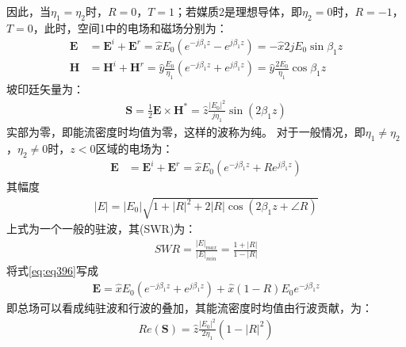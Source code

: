 \documentclass{article}
\numberwithin{equation}{section}
\begin{document}
因此，当$\eta_1=\eta_2$时，$R=0$，$T=1$；若媒质2是理想导体，即$\eta_2=0$时，$R=-1$，$T=0$，此时，空间1中的电场和磁场分别为：
\begin{align}
    \label{eq:eq393}
    \mathbf{E}&=\mathbf{E}^i+\mathbf{E}^r=\hat{x}E_0(e^{-j\beta_1z}-e^{j\beta_1z})=-\hat{x}2jE_0\sin\beta_1z \\
    \label{eq:eq394}
    \mathbf{H}&=\mathbf{H}^i+\mathbf{H}^r=\hat{y}\frac{E_0}{\eta_1}(e^{-j\beta_1z}+e^{j\beta_1z})=\hat{y}\frac{2E_0}{\eta_1}\cos\beta_1z
\end{align}
坡印廷矢量为：
\begin{align}
    \label{eq:eq395}
    \mathbf{S}=\frac{1}{2}\mathbf{E}\times\mathbf{H}^*=\hat{z}\frac{|E_0|^2}{j\eta_1}\sin(2\beta_1z)
\end{align}
实部为零，即能流密度时均值为零，这样的波称为纯\textbf{\color{blue}{驻波}}。
对于一般情况，即$\eta_1\neq\eta_2$，$\eta_2\neq0$时，$z<0$区域的电场为：
\begin{align}
    \label{eq:eq396}
    \mathbf{E}&=\mathbf{E}^i+\mathbf{E}^r=\hat{x}E_0(e^{-j\beta_1z}+Re^{j\beta_1z})
\end{align}
其幅度
\begin{align}
    \label{eq:eq397}
    |E|=|E_0|\sqrt{1+|R|^2+2|R|\cos(2\beta_1z+\angle R)}
\end{align}
上式为一个一般的驻波，其\textbf{\color{blue}{驻波比}}(SWR)为：
\begin{align}
    \label{eq:eq398}
    SWR=\frac{|E|_{max}}{|E|_{min}}=\frac{1+|R|}{1-|R|}
\end{align}
将式\ref{eq:eq396}写成
\begin{align}
    \label{eq:eq399}
    \mathbf{E}=\hat{x}E_0(e^{-j\beta_1z}+e^{j\beta_1z})+\hat{x}(1-R)E_0e^{-j\beta_1z}
\end{align}
即总场可以看成纯驻波和行波的叠加，其能流密度时均值由行波贡献，为：
\begin{align}
    \label{eq:eq400}
    Re(\mathbf{S})=\hat{z}\frac{|E_0|^2}{2\eta_1}(1-|R|^2)
\end{align}
\end{document}
